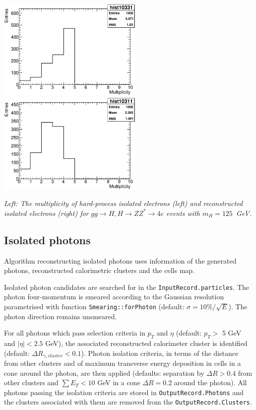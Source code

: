 \begin{Fighere}
\begin{center}
   \includegraphics[width=7.0cm,angle=0]{plot-HPisolElectrons.eps}
   \includegraphics[width=7.0cm,angle=0]{plot-recoElectrons.eps}
\end{center}
\caption{\em
Left: The multiplicity of  hard-process isolated electrons (left) and reconstructed isolated electrons (right) 
for $gg \to H, H \to ZZ^* \to 4 e$ events with $m_H=125$~GeV.
\label{FS2.3}} 
\end{Fighere}


\boldmath 
\subsection{Isolated photons}
\unboldmath

Algorithm reconstructing isolated photons uses information
of the generated photons, reconstructed calorimetric clusters and
the cells map.
 
Isolated photon candidates are searched for in the 
{\tt  InputRecord.particles}. The photon four-momentum is
smeared according to the Gaussian resolution parametrised with
function {\tt Smearing::forPhoton} (default: $\sigma = 10\%/\sqrt{E}$).
The photon direction remains unsmeared.

For all photons which pass selection criteria in $p_T$ and $\eta$
(default: $p_T >$ 5 GeV and $|\eta| < 2.5$ GeV), the associated 
reconstructed  calorimeter cluster is identified (default: $\Delta
R_{\gamma, cluster} < 0.1$). Photon isolation criteria, in terms of
the distance from other clusters and of maximum transverse energy 
deposition in cells in a cone around the photon, are then applied
(defaults: separation by $\Delta R > 0.4$ from other clusters and
$\sum E_T < 10$ GeV in a cone  $\Delta R = 0.2$ around the photon).
All photons passing the isolation criteria are stored in 
{\tt OutputRecord.Photons} and the clusters associated with them are
removed from the {\tt OutputRecord.Clusters}. 

